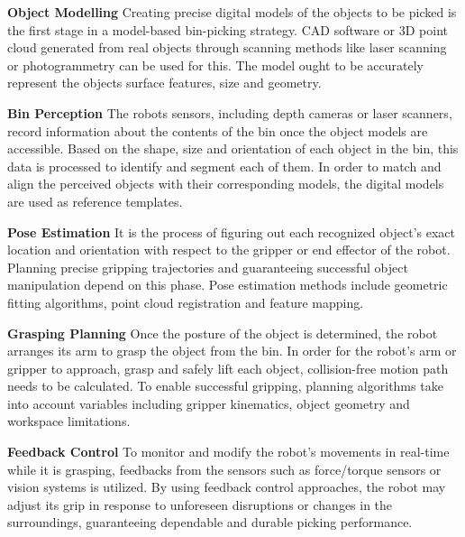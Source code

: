\vspace{5mm}

\textbf{Object Modelling} Creating precise digital models of the objects to be picked is the first stage in a model-based bin-picking strategy. \ac{CAD} software or 3D point cloud generated from real objects through scanning methods like laser scanning or photogrammetry can be used for this. The model ought to be accurately represent the objects surface features, size and geometry.\cite{lin2020robotic}

\vspace{5mm}

\textbf{Bin Perception} The robots sensors, including depth cameras or laser scanners, record information about the contents of the bin once the object models are accessible. Based on the shape, size and orientation of each object in the bin, this data is processed to identify and segment each of them. In order to match and align the perceived objects with their corresponding models, the digital models are used as reference templates.\cite{lin2020robotic}

\vspace{5mm}

\textbf{Pose Estimation} It is the process of figuring out each recognized object's exact location and orientation with respect to the gripper or end effector of the robot. Planning precise gripping trajectories and guaranteeing successful object manipulation depend on this phase. Pose estimation methods include geometric fitting algorithms, point cloud registration and feature mapping.\cite{lin2020robotic}

\vspace{5mm}

\textbf{Grasping Planning} Once the posture of the object is determined, the robot arranges its arm to grasp the object from the bin. In order for the robot's arm or gripper to approach, grasp and safely lift each object, collision-free motion path needs to be calculated. To enable successful gripping, planning algorithms take into account variables including gripper kinematics, object geometry and workspace limitations.\cite{lin2020robotic}

\vspace{5mm}

\textbf{Feedback Control} To monitor and modify the robot's movements in real-time while it is grasping, feedbacks from the sensors such as force/torque sensors or vision systems is utilized. By using feedback control approaches, the robot may adjust its grip in response to unforeseen disruptions or changes in the surroundings, guaranteeing dependable and durable picking performance.\cite{lin2020robotic}

